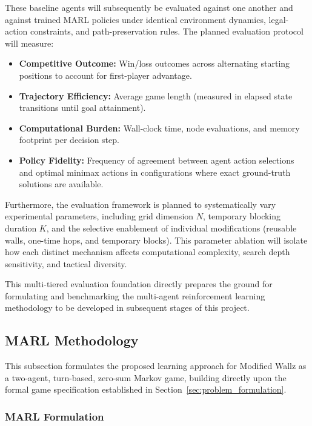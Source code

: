 \documentclass{article}
\begin{document}
These baseline agents will subsequently be evaluated against one another and against trained MARL policies under identical environment dynamics, legal-action constraints, and path-preservation rules. The planned evaluation protocol will measure:
\begin{itemize}
    \item \textbf{Competitive Outcome:} Win/loss outcomes across alternating starting positions to account for first-player advantage.
    \item \textbf{Trajectory Efficiency:} Average game length (measured in elapsed state transitions until goal attainment).
    \item \textbf{Computational Burden:} Wall-clock time, node evaluations, and memory footprint per decision step.
    \item \textbf{Policy Fidelity:} Frequency of agreement between agent action selections and optimal minimax actions in configurations where exact ground-truth solutions are available.
\end{itemize}

Furthermore, the evaluation framework is planned to systematically vary experimental parameters, including grid dimension $N$, temporary blocking duration $K$, and the selective enablement of individual modifications (reusable walls, one-time hops, and temporary blocks). This parameter ablation will isolate how each distinct mechanism affects computational complexity, search depth sensitivity, and tactical diversity. 

This multi-tiered evaluation foundation directly prepares the ground for formulating and benchmarking the multi-agent reinforcement learning methodology to be developed in subsequent stages of this project.

\subsection{MARL Methodology}
\label{subsec:marl_methodology}

This subsection formulates the proposed learning approach for Modified Wallz as a two-agent, turn-based, zero-sum Markov game, building directly upon the formal game specification established in Section~\ref{sec:problem_formulation}.

\subsubsection{MARL Formulation}
\label{subsubsec:marl_formulation}
\end{document}
